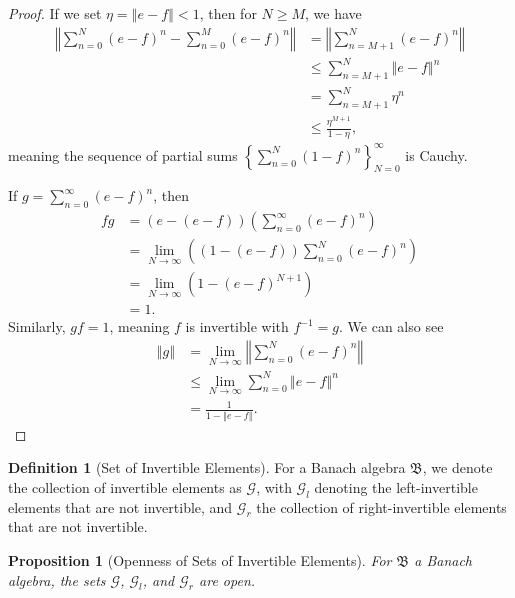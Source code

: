 \documentclass[12pt]{extarticle}
\newcommand{\norm}[1]{\left\Vert #1\right\Vert}
\newcommand{\set}[1]{\left\{#1\right\}}
\theoremstyle{plain}
\newtheorem*{proposition}{Proposition}
\theoremstyle{definition}
\newtheorem*{definition}{Definition}
\theoremstyle{note}
\renewcommand{\newline}{\hfill\break}
\begin{document}
\begin{proof}
  If we set $\eta = \norm{e-f} < 1$, then for $N\geq M$, we have
  \begin{align*}
    \norm{\sum_{n=0}^{N}\left(e-f\right)^{n} - \sum_{n=0}^{M}\left(e-f\right)^{n}} &= \norm{\sum_{n=M+1}^{N}\left(e-f\right)^{n}}\\
                                                                                   &\leq \sum_{n=M+1}^{N}\norm{e-f}^n\\
                                                                                   &= \sum_{n=M+1}^{N}\eta^{n}\\
                                                                                   &\leq \frac{\eta^{M+1}}{1-\eta},
  \end{align*}
  meaning the sequence of partial sums $\set{\sum_{n=0}^{N}(1-f)^n}_{N=0}^{\infty}$ is Cauchy.\newline

  If $g = \sum_{n=0}^{\infty}\left(e-f\right)^{n}$, then
  \begin{align*}
    fg &= \left(e-(e-f)\right)\left(\sum_{n=0}^{\infty}\left(e-f\right)^n\right)\\
       &= \lim_{N\rightarrow\infty}\left(\left(1-(e-f)\right)\sum_{n=0}^{N}\left(e-f\right)^{n}\right)\\
       &= \lim_{N\rightarrow\infty} \left(1-\left(e-f\right)^{N+1}\right)\\
       &= 1.
  \end{align*}
  Similarly, $gf = 1$, meaning $f$ is invertible with $f^{-1} = g$. We can also see
  \begin{align*}
    \norm{g} &= \lim_{N\rightarrow\infty}\norm{\sum_{n=0}^{N}\left(e-f\right)^n}\\
             &\leq \lim_{N\rightarrow\infty}\sum_{n=0}^{N}\norm{e-f}^n\\
             &= \frac{1}{1-\norm{e-f}}.
  \end{align*}
\end{proof}
\begin{definition}[Set of Invertible Elements]
  For a Banach algebra $\mathfrak{B}$, we denote the collection of invertible elements as $\mathcal{G}$, with $\mathcal{G}_{l}$ denoting the left-invertible elements that are not invertible, and $\mathcal{G}_{r}$ the collection of right-invertible elements that are not invertible.
\end{definition}
\begin{proposition}[Openness of Sets of Invertible Elements]
  For $\mathfrak{B}$ a Banach algebra, the sets $\mathcal{G}$, $\mathcal{G}_l$, and $\mathcal{G}_r$ are open.
\end{proposition}
\end{document}

